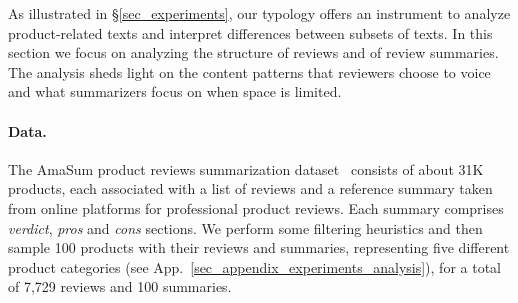 As illustrated in \S{\ref{sec_experiments}}, our typology offers an instrument to analyze product-related texts and interpret differences between subsets of texts. In this section we focus on analyzing the structure of reviews and of review summaries. The analysis sheds light on the content patterns that reviewers choose to voice and what summarizers focus on when space is limited.



\paragraph{Data.}
The AmaSum product reviews summarization dataset~\citep{brazinskas2021amasum} consists of about 31K products, each associated with a list of reviews and a reference summary taken from online platforms for professional product reviews.
Each summary comprises \emph{verdict}, \emph{pros} and \emph{cons} sections. 
We perform some filtering heuristics and then sample 100 products with their reviews and summaries, representing five different product categories (see App.~\ref{sec_appendix_experiments_analysis}), for a total of 7,729 reviews and 100 summaries.




